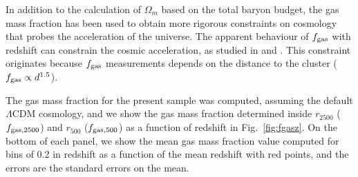 \documentclass{aa}
\begin{document}
In addition to the calculation of $\Omega_{m}$ based on the
total baryon budget, the gas mass fraction has been used to obtain
more rigorous constraints on cosmology that probes the acceleration of
the universe.  The apparent behaviour of $f_{\rm gas}$ 
with redshift can constrain the cosmic acceleration, as studied in 
\citet{ettori99} and \citet{allen04,allen08}. 
This constraint originates because 
$f_{\rm gas}$ measurements depends on the distance to the cluster ($f_{\rm
gas} \propto d^{1.5}$). 


The gas mass fraction for the present sample was computed,
  assuming the default $\Lambda$CDM cosmology, and we show the 
  gas mass fraction determined inside
  $r_{2500}$ ($f_{\rm gas,2500}$) and $r_{500}$ ($f_{\rm gas,500}$)
  as a function of redshift in
  Fig.~\ref{fig:fgasz}. On the bottom of each panel, we show 
  the mean gas mass fraction value computed for bins of 0.2
  in redshift as a function of the mean redshift with
  red points, and the errors are
  the standard errors on the mean.
\end{document}
